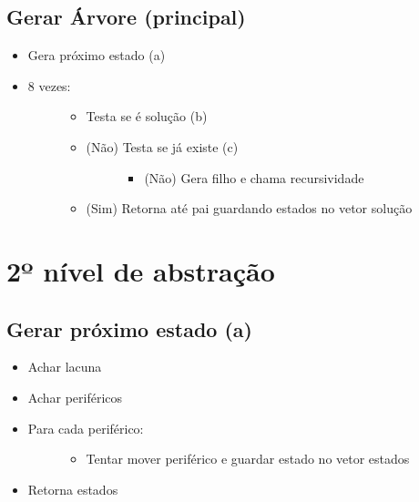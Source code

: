 \documentclass[letterpaper,10pt,openany,oneside,portuges]{sphinxmanual}
\begin{document}
\subsection{Gerar Árvore (principal)}
\label{\detokenize{pseudo:gerar-arvore-principal}}\begin{itemize}
\item {} 
Gera próximo estado  (a)

\item {} \begin{description}
\item[{8 vezes:}] \leavevmode\begin{itemize}
\item {} 
Testa se é solução (b)

\item {} \begin{description}
\item[{(Não) Testa se já existe (c)}] \leavevmode\begin{itemize}
\item {} 
(Não) Gera filho e chama recursividade

\end{itemize}

\end{description}

\item {} 
(Sim) Retorna até pai guardando estados no vetor solução

\end{itemize}

\end{description}

\end{itemize}


\section{2º nível de abstração}
\label{\detokenize{pseudo:o-nivel-de-abstracao}}

\subsection{Gerar próximo estado (a)}
\label{\detokenize{pseudo:gerar-proximo-estado-a}}\begin{itemize}
\item {} 
Achar lacuna

\item {} 
Achar periféricos

\item {} \begin{description}
\item[{Para cada periférico:}] \leavevmode\begin{itemize}
\item {} 
Tentar mover periférico e guardar estado no vetor estados

\end{itemize}

\end{description}

\item {} 
Retorna estados

\end{itemize}
\end{document}
